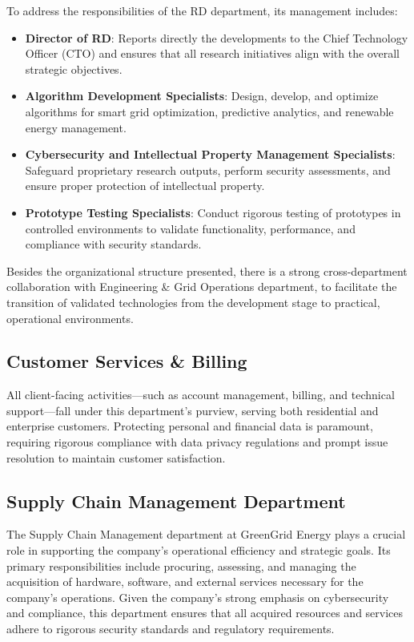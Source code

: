 To address the responsibilities of the \ac{RD} department, its management includes:

\begin{itemize}
    \item \textbf{Director of \ac{RD}}: Reports directly the developments to the Chief Technology Officer (CTO) and ensures that all research initiatives align with the overall strategic objectives.
    \item \textbf{Algorithm Development Specialists}: Design, develop, and optimize algorithms for smart grid optimization, predictive analytics, and renewable energy management.
    \item \textbf{Cybersecurity and Intellectual Property Management Specialists}: Safeguard proprietary research outputs, perform security assessments, and ensure proper protection of intellectual property.
    \item \textbf{Prototype Testing Specialists}: Conduct rigorous testing of prototypes in controlled environments to validate functionality, performance, and compliance with security standards.
\end{itemize}
Besides the organizational structure presented, there is a strong cross-department collaboration with Engineering \& Grid Operations department, to facilitate the transition of validated technologies from the development stage to practical, operational environments.

\subsection{Customer Services \& Billing}
All client-facing activities—such as account management, billing, and technical support—fall under this department's purview, serving both residential and enterprise customers. Protecting personal and financial data is paramount, requiring rigorous compliance with data privacy regulations and prompt issue resolution to maintain customer satisfaction.

\subsection{Supply Chain Management Department}

The Supply Chain Management department at GreenGrid Energy plays a crucial role in supporting the company's operational efficiency and strategic goals. Its primary responsibilities include procuring, assessing, and managing the acquisition of hardware, software, and external services necessary for the company's operations. Given the company's strong emphasis on cybersecurity and compliance, this department ensures that all acquired resources and services adhere to rigorous security standards and regulatory requirements.

